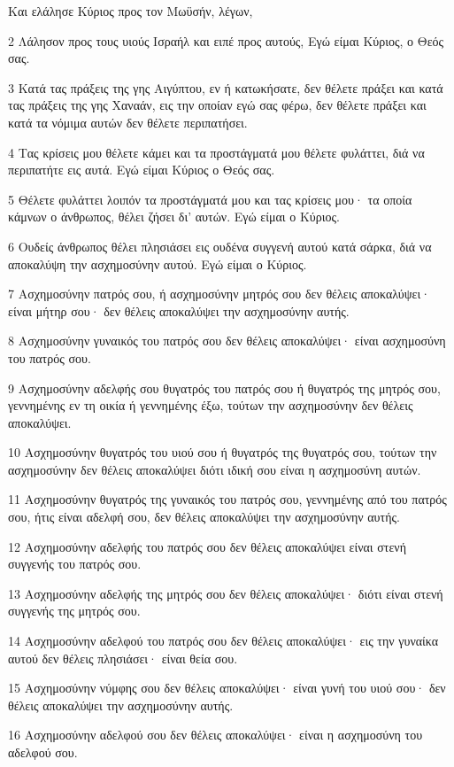 \par Και ελάλησε Κύριος προς τον Μωϋσήν, λέγων,
\par 2 Λάλησον προς τους υιούς Ισραήλ και ειπέ προς αυτούς, Εγώ είμαι Κύριος, ο Θεός σας.
\par 3 Κατά τας πράξεις της γης Αιγύπτου, εν ή κατωκήσατε, δεν θέλετε πράξει και κατά τας πράξεις της γης Χαναάν, εις την οποίαν εγώ σας φέρω, δεν θέλετε πράξει και κατά τα νόμιμα αυτών δεν θέλετε περιπατήσει.
\par 4 Τας κρίσεις μου θέλετε κάμει και τα προστάγματά μου θέλετε φυλάττει, διά να περιπατήτε εις αυτά. Εγώ είμαι Κύριος ο Θεός σας.
\par 5 Θέλετε φυλάττει λοιπόν τα προστάγματά μου και τας κρίσεις μου· τα οποία κάμνων ο άνθρωπος, θέλει ζήσει δι' αυτών. Εγώ είμαι ο Κύριος.
\par 6 Ουδείς άνθρωπος θέλει πλησιάσει εις ουδένα συγγενή αυτού κατά σάρκα, διά να αποκαλύψη την ασχημοσύνην αυτού. Εγώ είμαι ο Κύριος.
\par 7 Ασχημοσύνην πατρός σου, ή ασχημοσύνην μητρός σου δεν θέλεις αποκαλύψει· είναι μήτηρ σου· δεν θέλεις αποκαλύψει την ασχημοσύνην αυτής.
\par 8 Ασχημοσύνην γυναικός του πατρός σου δεν θέλεις αποκαλύψει· είναι ασχημοσύνη του πατρός σου.
\par 9 Ασχημοσύνην αδελφής σου θυγατρός του πατρός σου ή θυγατρός της μητρός σου, γεννημένης εν τη οικία ή γεννημένης έξω, τούτων την ασχημοσύνην δεν θέλεις αποκαλύψει.
\par 10 Ασχημοσύνην θυγατρός του υιού σου ή θυγατρός της θυγατρός σου, τούτων την ασχημοσύνην δεν θέλεις αποκαλύψει διότι ιδική σου είναι η ασχημοσύνη αυτών.
\par 11 Ασχημοσύνην θυγατρός της γυναικός του πατρός σου, γεννημένης από του πατρός σου, ήτις είναι αδελφή σου, δεν θέλεις αποκαλύψει την ασχημοσύνην αυτής.
\par 12 Ασχημοσύνην αδελφής του πατρός σου δεν θέλεις αποκαλύψει είναι στενή συγγενής του πατρός σου.
\par 13 Ασχημοσύνην αδελφής της μητρός σου δεν θέλεις αποκαλύψει· διότι είναι στενή συγγενής της μητρός σου.
\par 14 Ασχημοσύνην αδελφού του πατρός σου δεν θέλεις αποκαλύψει· εις την γυναίκα αυτού δεν θέλεις πλησιάσει· είναι θεία σου.
\par 15 Ασχημοσύνην νύμφης σου δεν θέλεις αποκαλύψει· είναι γυνή του υιού σου· δεν θέλεις αποκαλύψει την ασχημοσύνην αυτής.
\par 16 Ασχημοσύνην αδελφού σου δεν θέλεις αποκαλύψει· είναι η ασχημοσύνη του αδελφού σου.
